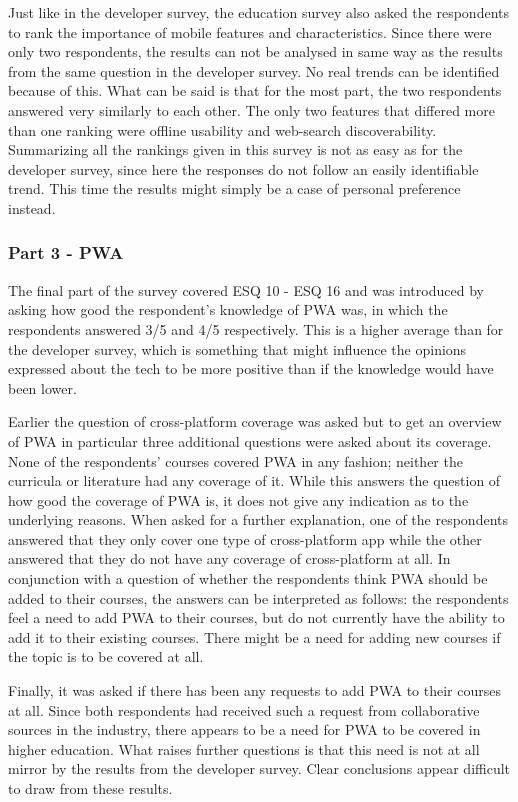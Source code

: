 \documentclass[a4paper,12pt]{article}
\begin{document}
Just like in the developer survey, the education survey also asked the respondents to rank the importance of mobile features and characteristics. Since there were only two respondents, the results can not be analysed in same way as the results from the same question in the developer survey. No real trends can be identified because of this. What can be said is that for the most part, the two respondents answered very similarly to each other. The only two features that differed more than one ranking were offline usability and web-search discoverability. Summarizing all the rankings given in this survey is not as easy as for the developer survey, since here the responses do not follow an easily identifiable trend. This time the results might simply be a case of personal preference instead.


\subsubsection{Part 3 - PWA}
\label{Analysis_eduSurvey_part3}
The final part of the survey covered ESQ 10 - ESQ 16 and was introduced by asking how good the respondent's knowledge of PWA was, in which the respondents answered 3/5 and 4/5 respectively. This is a higher average than for the developer survey, which is something that might influence the opinions expressed about the tech to be more positive than if the knowledge would have been lower.

Earlier the question of cross-platform coverage was asked but to get an overview of PWA in particular three additional questions were asked about its coverage. None of the respondents' courses covered PWA in any fashion; neither the curricula or literature had any coverage of it. While this answers the question of how good the coverage of PWA is, it does not give any indication as to the underlying reasons. When asked for a further explanation, one of the respondents answered that they only cover one type of cross-platform app while the other answered that they do not have any coverage of cross-platform at all. In conjunction with a question of whether the respondents think PWA should be added to their courses, the answers can be interpreted as follows: the respondents feel a need to add PWA to their courses, but do not currently have the ability to add it to their existing courses. There might be a need for adding new courses if the topic is to be covered at all.

Finally, it was asked if there has been any requests to add PWA to their courses at all. Since both respondents had received such a request from collaborative sources in the industry, there appears to be a need for PWA to be covered in higher education. What raises further questions is that this need is not at all mirror by the results from the developer survey. Clear conclusions appear difficult to draw from these results.
\end{document}

